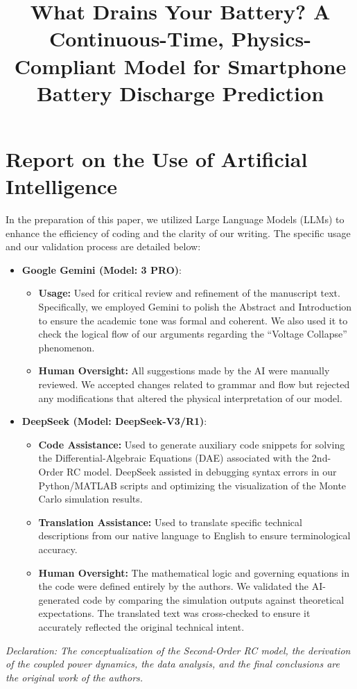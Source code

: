 \documentclass[12pt]{article}
\title{What Drains Your Battery? A Continuous-Time, Physics-Compliant Model for Smartphone Battery Discharge Prediction}
\begin{document}

\maketitle  
\tableofcontents







\newpage

\newpage
\section*{Report on the Use of Artificial Intelligence}

In the preparation of this paper, we utilized Large Language Models (LLMs) to enhance the efficiency of coding and the clarity of our writing. The specific usage and our validation process are detailed below:

\begin{itemize}
    \item \textbf{Google Gemini (Model: 3 PRO)}:
    \begin{itemize}
        \item \textbf{Usage:} Used for critical review and refinement of the manuscript text. Specifically, we employed Gemini to polish the Abstract and Introduction to ensure the academic tone was formal and coherent. We also used it to check the logical flow of our arguments regarding the ``Voltage Collapse'' phenomenon.
        \item \textbf{Human Oversight:} All suggestions made by the AI were manually reviewed. We accepted changes related to grammar and flow but rejected any modifications that altered the physical interpretation of our model.
    \end{itemize}

    \item \textbf{DeepSeek (Model: DeepSeek-V3/R1)}:
    \begin{itemize}
        \item \textbf{Code Assistance:} Used to generate auxiliary code snippets for solving the Differential-Algebraic Equations (DAE) associated with the 2nd-Order RC model. DeepSeek assisted in debugging syntax errors in our Python/MATLAB scripts and optimizing the visualization of the Monte Carlo simulation results.
        \item \textbf{Translation Assistance:} Used to translate specific technical descriptions from our native language to English to ensure terminological accuracy.
        \item \textbf{Human Oversight:} The mathematical logic and governing equations in the code were defined entirely by the authors. We validated the AI-generated code by comparing the simulation outputs against theoretical expectations. The translated text was cross-checked to ensure it accurately reflected the original technical intent.
    \end{itemize}
\end{itemize}

\vspace{1em}
\noindent \textit{Declaration: The conceptualization of the Second-Order RC model, the derivation of the coupled power dynamics, the data analysis, and the final conclusions are the original work of the authors.}
\end{document}
